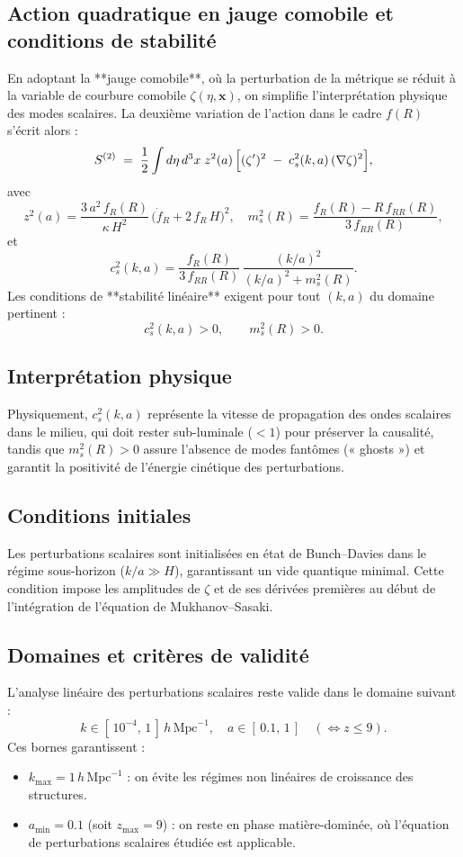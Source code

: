 \subsection{Action quadratique en jauge comobile et conditions de stabilité}
En adoptant la **jauge comobile**, où la perturbation de la métrique se réduit à la variable de courbure comobile \(\zeta(\eta,\mathbf{x})\), on simplifie l’interprétation physique des modes scalaires. La deuxième variation de l’action dans le cadre \(f(R)\) s’écrit alors :
\[
  S^{(2)} \;=\; \frac{1}{2}\int d\eta\,d^{3}x\;z^{2}(a)\,
    \Bigl[(\zeta')^{2} \;-\; c_{s}^{2}(k,a)\,(\nabla\zeta)^{2}\Bigr],
\]
avec
\[
  z^{2}(a)
  = 
  \frac{3\,a^{2}\,f_{R}(R)}{\kappa\,H^{2}}\,
  \bigl(\dot f_{R} + 2\,f_{R}\,H\bigr)^{2},
  \quad
  m_{s}^{2}(R)
  =
  \frac{f_{R}(R) - R\,f_{RR}(R)}{3\,f_{RR}(R)},
\]
et
\[
  c_{s}^{2}(k,a)
  =
  \frac{f_{R}(R)}{3\,f_{RR}(R)}
  \,\frac{(k/a)^{2}}{(k/a)^{2} + m_{s}^{2}(R)}.
\]
Les conditions de **stabilité linéaire** exigent pour tout \((k,a)\) du domaine pertinent :
\[
  c_{s}^{2}(k,a) > 0,
  \qquad
  m_{s}^{2}(R) > 0.
\]

\subsection{Interprétation physique}
Physiquement, \(c_{s}^{2}(k,a)\) représente la vitesse de propagation des ondes scalaires dans le milieu, qui doit rester sub-luminale (\(<1\)) pour préserver la causalité, tandis que \(m_{s}^{2}(R)>0\) assure l’absence de modes fantômes (« ghosts ») et garantit la positivité de l’énergie cinétique des perturbations.

\subsection{Conditions initiales}
Les perturbations scalaires sont initialisées en état de Bunch–Davies dans le régime sous-horizon (\(k/a \gg H\)), garantissant un vide quantique minimal.  
Cette condition impose les amplitudes de \(\zeta\) et de ses dérivées premières au début de l’intégration de l’équation de Mukhanov–Sasaki.

\subsection{Domaines et critères de validité}
L’analyse linéaire des perturbations scalaires reste valide dans le domaine suivant :
\[
  k \in [\,10^{-4},\,1\,]\,h\,\mathrm{Mpc}^{-1},
  \quad
  a \in [\,0.1,\,1\,]
  \quad(\Leftrightarrow z \le 9).
\]
Ces bornes garantissent :
\begin{itemize}
  \item \(k_{\max}=1\,h\,\mathrm{Mpc}^{-1}\) : on évite les régimes non linéaires de croissance des structures.  
  \item \(a_{\min}=0.1\) (soit \(z_{\max}=9\)) : on reste en phase matière-dominée, où l’équation de perturbations scalaires étudiée est applicable.  
\end{itemize}

